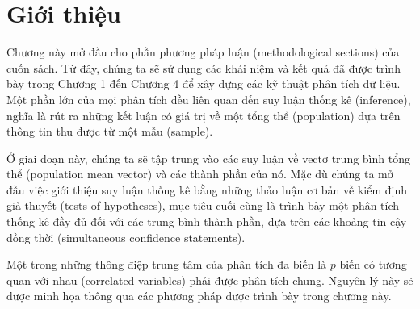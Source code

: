 
\section{Giới thiệu}
\label{sec:ch05-01}

Chương này mở đầu cho phần phương pháp luận (methodological sections) của cuốn
sách. Từ đây, chúng ta sẽ sử dụng các khái niệm và kết quả đã được trình bày
trong Chương 1 đến Chương 4 để xây dựng các kỹ thuật phân tích dữ liệu. Một
phần lớn của mọi phân tích đều liên quan đến suy luận thống kê (inference),
nghĩa là rút ra những kết luận có giá trị về một tổng thể (population) dựa trên
thông tin thu được từ một mẫu (sample).

Ở giai đoạn này, chúng ta sẽ tập trung vào các suy luận về vectơ trung bình
tổng thể (population mean vector) và các thành phần của nó. Mặc dù chúng ta mở
đầu việc giới thiệu suy luận thống kê bằng những thảo luận cơ bản về kiểm định
giả thuyết (tests of hypotheses), mục tiêu cuối cùng là trình bày một phân tích
thống kê đầy đủ đối với các trung bình thành phần, dựa trên các khoảng tin cậy
đồng thời (simultaneous confidence statements).

Một trong những thông điệp trung tâm của phân tích đa biến là \(p\) biến có
tương quan với nhau (correlated variables) phải được phân tích chung. Nguyên lý
này sẽ được minh họa thông qua các phương pháp được trình bày trong chương này.
